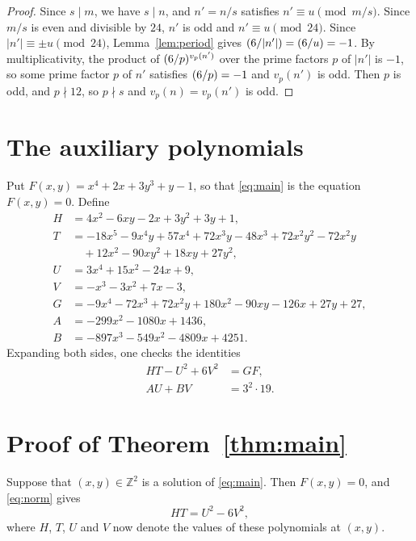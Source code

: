 \documentclass[11pt]{article}
\newcommand{\Z}{\mathbb{Z}}
\newcommand{\leg}[2]{\mathchoice{\biggl(\dfrac{#1}{#2}\biggr)}{(#1/#2)}{(#1/#2)}{(#1/#2)}}
\begin{document}
\begin{proof}
Since $s\mid m$, we have $s\mid n$, and $n'=n/s$ satisfies $n'\equiv u\pmod{m/s}$. Since $m/s$ is even and divisible by $24$, $n'$ is odd and $n'\equiv u\pmod{24}$. Since $|n'|\equiv\pm u\pmod{24}$, Lemma~\ref{lem:period} gives $\leg{6}{|n'|}=\leg{6}{u}=-1$. By multiplicativity, the product of $\leg{6}{p}^{v_p(n')}$ over the prime factors $p$ of $|n'|$ is $-1$, so some prime factor $p$ of $n'$ satisfies $\leg{6}{p}=-1$ and $v_p(n')$ is odd. Then $p$ is odd, and $p\nmid12$, so $p\nmid s$ and $v_p(n)=v_p(n')$ is odd.
\end{proof}

\section{The auxiliary polynomials}

Put $F(x,y)=x^{4}+2x+3y^{3}+y-1$, so that \eqref{eq:main} is the equation $F(x,y)=0$. Define
\begin{align*}
H&=4x^{2}-6xy-2x+3y^{2}+3y+1,\\
T&=-18x^{5}-9x^{4}y+57x^{4}+72x^{3}y-48x^{3}+72x^{2}y^{2}-72x^{2}y\\
&\quad+12x^{2}-90xy^{2}+18xy+27y^{2},\\
U&=3x^{4}+15x^{2}-24x+9,\\
V&=-x^{3}-3x^{2}+7x-3,\\
G&=-9x^{4}-72x^{3}+72x^{2}y+180x^{2}-90xy-126x+27y+27,\\
A&=-299x^{2}-1080x+1436,\\
B&=-897x^{3}-549x^{2}-4809x+4251.
\end{align*}
Expanding both sides, one checks the identities
\begin{align}
HT-U^2+6V^2&=GF,\label{eq:norm}\\
AU+BV&=3^{2}\cdot 19.\label{eq:bezout}
\end{align}

\section{Proof of Theorem~\ref{thm:main}}

Suppose that $(x,y)\in\Z^2$ is a solution of \eqref{eq:main}. Then $F(x,y)=0$, and \eqref{eq:norm} gives
\begin{equation}\label{eq:HT}
HT=U^2-6V^2,
\end{equation}
where $H$, $T$, $U$ and $V$ now denote the values of these polynomials at $(x,y)$.
\end{document}
